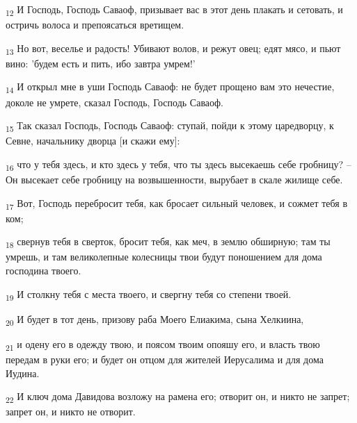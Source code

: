 \begin{tcolorbox}
\textsubscript{12} И Господь, Господь Саваоф, призывает вас в этот день плакать и сетовать, и остричь волоса и препоясаться вретищем.
\end{tcolorbox}
\begin{tcolorbox}
\textsubscript{13} Но вот, веселье и радость! Убивают волов, и режут овец; едят мясо, и пьют вино: 'будем есть и пить, ибо завтра умрем!'
\end{tcolorbox}
\begin{tcolorbox}
\textsubscript{14} И открыл мне в уши Господь Саваоф: не будет прощено вам это нечестие, доколе не умрете, сказал Господь, Господь Саваоф.
\end{tcolorbox}
\begin{tcolorbox}
\textsubscript{15} Так сказал Господь, Господь Саваоф: ступай, пойди к этому царедворцу, к Севне, начальнику дворца [и скажи ему]:
\end{tcolorbox}
\begin{tcolorbox}
\textsubscript{16} что у тебя здесь, и кто здесь у тебя, что ты здесь высекаешь себе гробницу? --Он высекает себе гробницу на возвышенности, вырубает в скале жилище себе.
\end{tcolorbox}
\begin{tcolorbox}
\textsubscript{17} Вот, Господь перебросит тебя, как бросает сильный человек, и сожмет тебя в ком;
\end{tcolorbox}
\begin{tcolorbox}
\textsubscript{18} свернув тебя в сверток, бросит тебя, как меч, в землю обширную; там ты умрешь, и там великолепные колесницы твои будут поношением для дома господина твоего.
\end{tcolorbox}
\begin{tcolorbox}
\textsubscript{19} И столкну тебя с места твоего, и свергну тебя со степени твоей.
\end{tcolorbox}
\begin{tcolorbox}
\textsubscript{20} И будет в тот день, призову раба Моего Елиакима, сына Хелкиина,
\end{tcolorbox}
\begin{tcolorbox}
\textsubscript{21} и одену его в одежду твою, и поясом твоим опояшу его, и власть твою передам в руки его; и будет он отцом для жителей Иерусалима и для дома Иудина.
\end{tcolorbox}
\begin{tcolorbox}
\textsubscript{22} И ключ дома Давидова возложу на рамена его; отворит он, и никто не запрет; запрет он, и никто не отворит.
\end{tcolorbox}
